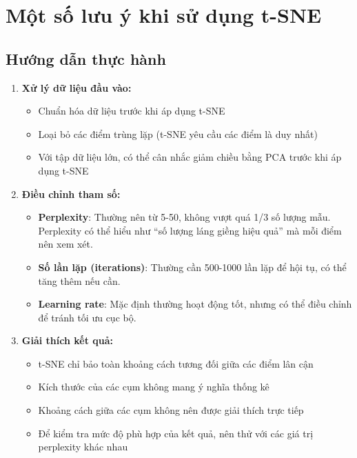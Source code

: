\documentclass[
]{article}
\providecommand{\tightlist}{%
  \setlength{\itemsep}{0pt}\setlength{\parskip}{0pt}}
\begin{document}
\section{Một số lưu ý khi sử dụng
t-SNE}\label{mux1ed9t-sux1ed1-lux1b0u-uxfd-khi-sux1eed-dux1ee5ng-t-sne}

\subsection{Hướng dẫn thực
hành}\label{hux1b0ux1edbng-dux1eabn-thux1ef1c-huxe0nh}

\begin{enumerate}
\def\labelenumi{\arabic{enumi}.}
\tightlist
\item
  \textbf{Xử lý dữ liệu đầu vào:}

  \begin{itemize}
  \tightlist
  \item
    Chuẩn hóa dữ liệu trước khi áp dụng t-SNE
  \item
    Loại bỏ các điểm trùng lặp (t-SNE yêu cầu các điểm là duy nhất)
  \item
    Với tập dữ liệu lớn, có thể cân nhắc giảm chiều bằng PCA trước khi
    áp dụng t-SNE
  \end{itemize}
\item
  \textbf{Điều chỉnh tham số:}

  \begin{itemize}
  \tightlist
  \item
    \textbf{Perplexity}: Thường nên từ 5-50, không vượt quá 1/3 số lượng
    mẫu. Perplexity có thể hiểu như ``số lượng láng giềng hiệu quả'' mà
    mỗi điểm nên xem xét.
  \item
    \textbf{Số lần lặp (iterations)}: Thường cần 500-1000 lần lặp để hội
    tụ, có thể tăng thêm nếu cần.
  \item
    \textbf{Learning rate}: Mặc định thường hoạt động tốt, nhưng có thể
    điều chỉnh để tránh tối ưu cục bộ.
  \end{itemize}
\item
  \textbf{Giải thích kết quả:}

  \begin{itemize}
  \tightlist
  \item
    t-SNE chỉ bảo toàn khoảng cách tương đối giữa các điểm lân cận
  \item
    Kích thước của các cụm không mang ý nghĩa thống kê
  \item
    Khoảng cách giữa các cụm không nên được giải thích trực tiếp
  \item
    Để kiểm tra mức độ phù hợp của kết quả, nên thử với các giá trị
    perplexity khác nhau
  \end{itemize}
\end{enumerate}
\end{document}
